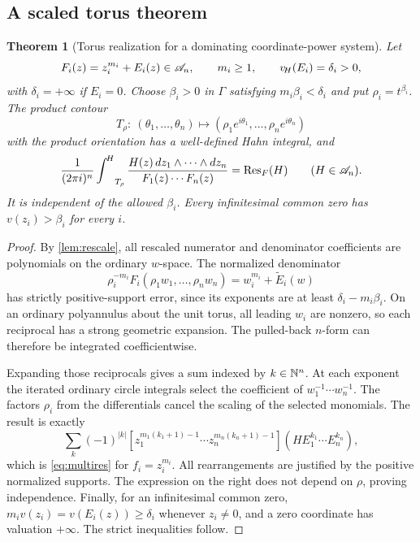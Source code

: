 \documentclass[11pt,letterpaper]{article}
\newtheorem{theorem}{Theorem}[section]
\theoremstyle{definition}
\theoremstyle{remark}
\newcommand{\Res}{\operatorname{Res}}\newcommand{\res}{\operatorname{res}}\newcommand{\ord}{\operatorname{ord}}\newcommand{\Tr}{\operatorname{Tr}}
\newcommand{\vH}{v_{\!H}}\newcommand{\re}{\operatorname{Re}}\newcommand{\im}{\operatorname{Im}}
\newcommand{\HInt}{\mathop{\int^{\!H}}\nolimits}\newcommand{\HCoint}{\mathop{\oint^{\!H}}\nolimits}
\numberwithin{equation}{section}
\begin{document}
\subsection{A scaled torus theorem}
\begin{theorem}[Torus realization for a dominating coordinate-power system]\label{thm:torus}
Let
\[
 F_i(z)=z_i^{m_i}+E_i(z)\in\A_n,\qquad m_i\ge1,\qquad
 \vH(E_i)=\delta_i>0,
\]
with $\delta_i=+\infty$ if $E_i=0$. Choose $\beta_i>0$ in $\Gamma$ satisfying $m_i\beta_i<\delta_i$ and put $\rho_i=t^{\beta_i}$. The product contour
\[
 T_\rho:\ (\theta_1,\ldots,\theta_n)
       \longmapsto(\rho_1e^{i\theta_1},\ldots,\rho_ne^{i\theta_n})
\]
with the product orientation has a well-defined Hahn integral, and
\begin{equation}\label{eq:torus}
 \frac1{(2\pi i)^n}\HInt_{T_\rho}
      \frac{H(z)\,dz_1\wedge\cdots\wedge dz_n}{F_1(z)\cdots F_n(z)}
       =\Res_F(H)\qquad(H\in\A_n).
\end{equation}
It is independent of the allowed $\beta_i$. Every infinitesimal common zero has $v(z_i)>\beta_i$ for every $i$.
\end{theorem}
\begin{proof}
By \cref{lem:rescale}, all rescaled numerator and denominator coefficients are polynomials on the ordinary $w$-space. The normalized denominator
\[
 \rho_i^{-m_i}F_i(\rho_1w_1,\ldots,\rho_nw_n)
 =w_i^{m_i}+\widetilde E_i(w)
\]
has strictly positive-support error, since its exponents are at least $\delta_i-m_i\beta_i$. On an ordinary polyannulus about the unit torus, all leading $w_i$ are nonzero, so each reciprocal has a strong geometric expansion. The pulled-back $n$-form can therefore be integrated coefficientwise.

Expanding those reciprocals gives a sum indexed by $k\in\mathbb N^n$. At each exponent the iterated ordinary circle integrals select the coefficient of $w_1^{-1}\cdots w_n^{-1}$. The factors $\rho_i$ from the differentials cancel the scaling of the selected monomials. The result is exactly
\[
 \sum_k(-1)^{|k|}
 [z_1^{m_1(k_1+1)-1}\cdots z_n^{m_n(k_n+1)-1}]
      (H E_1^{k_1}\cdots E_n^{k_n}),
\]
which is \eqref{eq:multires} for $f_i=z_i^{m_i}$. All rearrangements are justified by the positive normalized supports. The expression on the right does not depend on $\rho$, proving independence. Finally, for an infinitesimal common zero, $m_i v(z_i)=v(E_i(z))\ge\delta_i$ whenever $z_i\ne0$, and a zero coordinate has valuation $+\infty$. The strict inequalities follow.
\end{proof}
\end{document}
